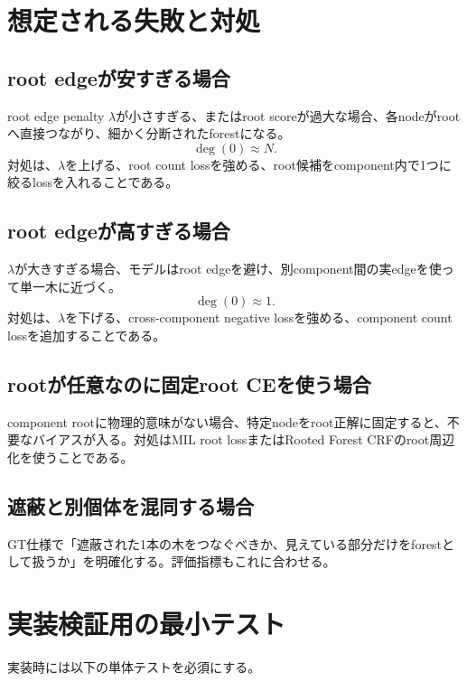 \documentclass[11pt,a4paper]{article}
\begin{document}
\section{想定される失敗と対処}
\subsection{root edgeが安すぎる場合}
root edge penalty $\lambda$が小さすぎる、またはroot scoreが過大な場合、各nodeがrootへ直接つながり、細かく分断されたforestになる。
\begin{equation}
  \deg(0)\approx N.
\end{equation}
対処は、$\lambda$を上げる、root count lossを強める、root候補をcomponent内で1つに絞るlossを入れることである。

\subsection{root edgeが高すぎる場合}
$\lambda$が大きすぎる場合、モデルはroot edgeを避け、別component間の実edgeを使って単一木に近づく。
\begin{equation}
  \deg(0)\approx 1.
\end{equation}
対処は、$\lambda$を下げる、cross-component negative lossを強める、component count lossを追加することである。

\subsection{rootが任意なのに固定root CEを使う場合}
component rootに物理的意味がない場合、特定nodeをroot正解に固定すると、不要なバイアスが入る。対処はMIL root lossまたはRooted Forest CRFのroot周辺化を使うことである。

\subsection{遮蔽と別個体を混同する場合}
GT仕様で「遮蔽された1本の木をつなぐべきか、見えている部分だけをforestとして扱うか」を明確化する。評価指標もこれに合わせる。

\section{実装検証用の最小テスト}
実装時には以下の単体テストを必須にする。
\end{document}
